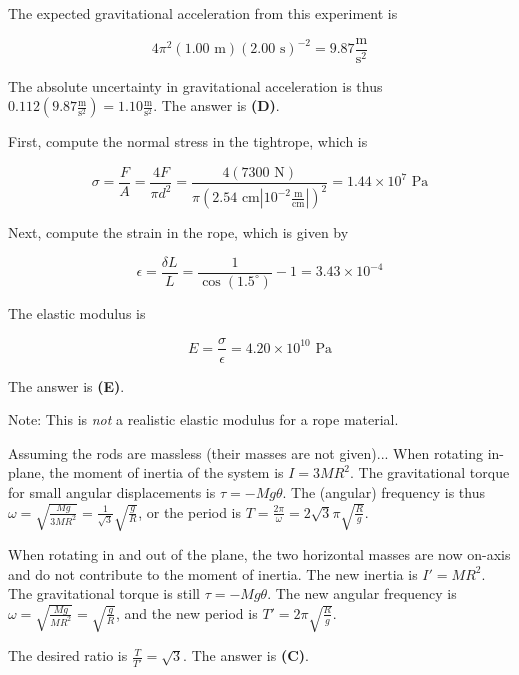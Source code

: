 \documentclass[12pt]{article}
\begin{document}
The expected gravitational acceleration from this experiment is

$$4 \pi^2 (1.00 \text{ m}) (2.00 \text{ s})^{-2} = 9.87 \frac{\text{m}}{\text{s}^2}$$

The absolute uncertainty in gravitational acceleration is thus $0.112 \left( 9.87 \frac{\text{m}}{\text{s}^2} \right) = 1.10 \frac{\text{m}}{\text{s}^2}$. The answer is \textbf{(D)}.


\vspace{2 \baselineskip}



First, compute the normal stress in the tightrope, which is

$$\sigma = \frac{F}{A} = \frac{4 F}{\pi d^2} = \frac{4 (7300 \text{ N})}{\pi \left( 2.54 \text{ cm} \left| 10^{-2} \frac{\text{m}}{\text{cm}} \right| \right)^2} = 1.44 \times 10^{7} \text{ Pa}$$

Next, compute the strain in the rope, which is given by

$$\epsilon = \frac{\delta L}{L} = \frac{1}{\cos (1.5^\circ)} - 1 = 3.43 \times 10^{-4}$$

The elastic modulus is

$$E = \frac{\sigma}{\epsilon} = 4.20 \times 10^{10} \text{ Pa}$$

The answer is \textbf{(E)}.

Note: This is \textit{not} a realistic elastic modulus for a rope material.


\vspace{2 \baselineskip}


Assuming the rods are massless (their masses are not given)... When rotating in-plane, the moment of inertia of the system is $I = 3 M R^2$. The gravitational torque for small angular displacements is $\tau = -M g \theta$. The (angular) frequency is thus $\omega = \sqrt{\frac{M g}{3 M R^2}} = \frac{1}{\sqrt{3}} \sqrt{\frac{g}{R}}$, or the period is $T = \frac{2 \pi}{\omega} = 2 \sqrt{3} \pi \sqrt{\frac{R}{g}}$.

When rotating in and out of the plane, the two horizontal masses are now on-axis and do not contribute to the moment of inertia. The new inertia is $I' = M R^2$. The gravitational torque is still $\tau = -M g \theta$. The new angular frequency is $\omega = \sqrt{\frac{M g}{M R^2}} = \sqrt{\frac{g}{R}}$, and the new period is $T' = 2 \pi \sqrt{\frac{R}{g}}$.

The desired ratio is $\frac{T}{T'} = \sqrt{3}$. The answer is \textbf{(C)}.
\end{document}

